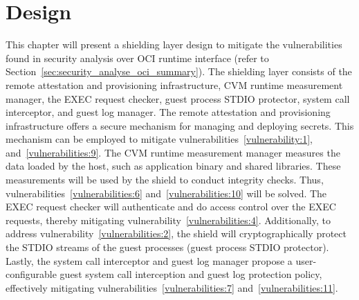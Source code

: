\chapter{Design}
\label{sec:design}




This chapter will present a shielding layer design to mitigate the vulnerabilities found in security analysis over OCI runtime interface (refer to Section~\ref{sec:security_analyse_oci_summary}). The shielding layer consists of the remote attestation and provisioning infrastructure, CVM runtime measurement manager, the EXEC request checker, 
guest process STDIO protector, system call interceptor, and guest log manager. The remote attestation and provisioning infrastructure offers a secure mechanism for managing and deploying secrets. This mechanism can be employed to mitigate vulnerabilities~\ref{vulnerability:1}, and~\ref{vulnerabilities:9}. The CVM runtime measurement manager measures the data 
loaded by the host, such as application binary and shared libraries. These measurements will be used by the shield to conduct integrity checks. Thus, vulnerabilities~\ref{vulnerabilities:6} and~\ref{vulnerabilities:10}  will be solved. The EXEC request checker will authenticate and do access control over the EXEC 
requests, thereby mitigating vulnerability~\ref{vulnerabilities:4}. Additionally, to address vulnerability~\ref{vulnerabilities:2}, the shield will cryptographically protect the STDIO streams of the guest processes (guest process STDIO protector). Lastly, the system call interceptor and guest log manager propose 
a user-configurable guest system call interception and guest log protection policy,  effectively mitigating vulnerabilities~\ref{vulnerabilities:7} and~\ref{vulnerabilities:11}.


